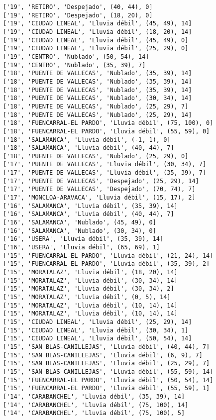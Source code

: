 \documentclass[11pt]{article}
\begin{document}
\begin{Verbatim}[commandchars=\\\{\}]
['19', 'RETIRO', 'Despejado', (40, 44), 0]
['19', 'RETIRO', 'Despejado', (18, 20), 0]
['19', 'CIUDAD LINEAL', 'Lluvia débil', (45, 49), 14]
['19', 'CIUDAD LINEAL', 'Lluvia débil', (18, 20), 14]
['19', 'CIUDAD LINEAL', 'Lluvia débil', (45, 49), 0]
['19', 'CIUDAD LINEAL', 'Lluvia débil', (25, 29), 0]
['19', 'CENTRO', 'Nublado', (50, 54), 14]
['19', 'CENTRO', 'Nublado', (35, 39), 7]
['18', 'PUENTE DE VALLECAS', 'Nublado', (35, 39), 14]
['18', 'PUENTE DE VALLECAS', 'Nublado', (35, 39), 14]
['18', 'PUENTE DE VALLECAS', 'Nublado', (35, 39), 14]
['18', 'PUENTE DE VALLECAS', 'Nublado', (30, 34), 14]
['18', 'PUENTE DE VALLECAS', 'Nublado', (25, 29), 7]
['18', 'PUENTE DE VALLECAS', 'Nublado', (25, 29), 14]
['18', 'FUENCARRAL-EL PARDO', 'Lluvia débil', (75, 100), 0]
['18', 'FUENCARRAL-EL PARDO', 'Lluvia débil', (55, 59), 0]
['18', 'SALAMANCA', 'Lluvia débil', (-1, 1), 0]
['18', 'SALAMANCA', 'Lluvia débil', (40, 44), 7]
['18', 'PUENTE DE VALLECAS', 'Nublado', (25, 29), 0]
['17', 'PUENTE DE VALLECAS', 'Lluvia débil', (30, 34), 7]
['17', 'PUENTE DE VALLECAS', 'Lluvia débil', (35, 39), 7]
['17', 'PUENTE DE VALLECAS', 'Despejado', (25, 29), 14]
['17', 'PUENTE DE VALLECAS', 'Despejado', (70, 74), 7]
['17', 'MONCLOA-ARAVACA', 'Lluvia débil', (15, 17), 2]
['16', 'SALAMANCA', 'Lluvia débil', (35, 39), 14]
['16', 'SALAMANCA', 'Lluvia débil', (40, 44), 7]
['16', 'SALAMANCA', 'Nublado', (45, 49), 0]
['16', 'SALAMANCA', 'Nublado', (30, 34), 0]
['16', 'USERA', 'Lluvia débil', (35, 39), 14]
['16', 'USERA', 'Lluvia débil', (65, 69), 1]
['15', 'FUENCARRAL-EL PARDO', 'Lluvia débil', (21, 24), 14]
['15', 'FUENCARRAL-EL PARDO', 'Lluvia débil', (35, 39), 2]
['15', 'MORATALAZ', 'Lluvia débil', (18, 20), 14]
['15', 'MORATALAZ', 'Lluvia débil', (30, 34), 14]
['15', 'MORATALAZ', 'Lluvia débil', (30, 34), 2]
['15', 'MORATALAZ', 'Lluvia débil', (0, 5), 14]
['15', 'MORATALAZ', 'Lluvia débil', (10, 14), 14]
['15', 'MORATALAZ', 'Lluvia débil', (10, 14), 14]
['15', 'CIUDAD LINEAL', 'Lluvia débil', (25, 29), 14]
['15', 'CIUDAD LINEAL', 'Lluvia débil', (30, 34), 1]
['15', 'CIUDAD LINEAL', 'Lluvia débil', (50, 54), 14]
['15', 'SAN BLAS-CANILLEJAS', 'Lluvia débil', (40, 44), 7]
['15', 'SAN BLAS-CANILLEJAS', 'Lluvia débil', (6, 9), 7]
['15', 'SAN BLAS-CANILLEJAS', 'Lluvia débil', (25, 29), 7]
['15', 'SAN BLAS-CANILLEJAS', 'Lluvia débil', (55, 59), 14]
['15', 'FUENCARRAL-EL PARDO', 'Lluvia débil', (50, 54), 14]
['15', 'FUENCARRAL-EL PARDO', 'Lluvia débil', (55, 59), 1]
['14', 'CARABANCHEL', 'Lluvia débil', (35, 39), 14]
['14', 'CARABANCHEL', 'Lluvia débil', (75, 100), 14]
['14', 'CARABANCHEL', 'Lluvia débil', (75, 100), 5]

\end{Verbatim}
\end{document}

